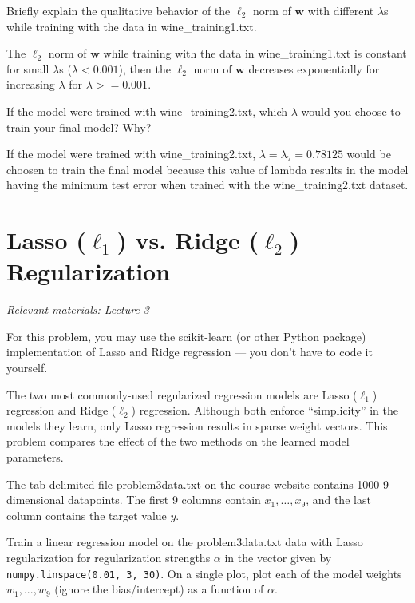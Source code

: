 \problem[4]
Briefly explain the qualitative behavior of the $\ell_2$ norm of $\textbf{w}$ with different $\lambda$s while training with the data in wine\_training1.txt.

The $\ell_2$ norm of $\textbf{w}$ while training with the data in wine\_training1.txt is constant for small $\lambda$s ($\lambda < 0.001$), then the $\ell_2$ norm of $\textbf{w}$ decreases exponentially for increasing $\lambda$ for $\lambda >= 0.001$.

\problem[4]
If the model were trained with wine\_training2.txt, which $\lambda$ would you choose to train your final model? Why?

If the model were trained with wine\_training2.txt, $\lambda = \lambda_7 = 0.78125$ would be choosen to train the final model because this value of lambda results in the model having the minimum test error when trained with the wine\_training2.txt dataset.

\newpage
\section{Lasso (\texorpdfstring{$\ell_1$}{L1}) vs. Ridge (\texorpdfstring{$\ell_2$}{L2}) Regularization}
\textit{Relevant materials: Lecture 3}

For this problem, you may use the scikit-learn (or other Python package) implementation of Lasso and Ridge regression --- you don't have to code it yourself.

The two most commonly-used regularized regression models are Lasso ($\ell_1$) regression and Ridge ($\ell_2$) regression.
Although both enforce ``simplicity'' in the models they learn, only Lasso regression results in sparse weight vectors.
This problem compares the effect of the two methods on the learned model parameters.

\problem[12] %
The tab-delimited file problem3data.txt on the course website contains 1000 9-dimensional datapoints.  The first 9 columns contain $x_1,\ldots,x_9$, and the last column contains the target value $y$.

\subproblem
Train a linear regression model on the problem3data.txt data with Lasso regularization for regularization strengths $\alpha$ in the vector given by \texttt{numpy.linspace(0.01, 3, 30)}.
On a single plot, plot each of the model weights $w_1, ..., w_9$ (ignore the bias/intercept) as a function of $\alpha$.

